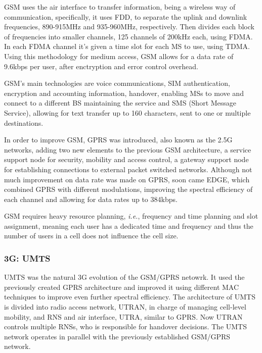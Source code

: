 \gls{GSM} uses the air interface to transfer information, being a wireless way of communication, specifically, it uses \gls{FDD}, to separate the uplink and downlink frequencies, 890-915MHz and 935-960MHz, respectively. Then divides each block of frequencies into smaller channels, 125 channels of 200kHz each, using \gls{FDMA}. In each \gls{FDMA} channel it's given a time slot for each \gls{MS} to use, using \gls{TDMA}. Using this methodology for medium access, \gls{GSM} allows for a data rate of 9.6kbps per user, after enctryption and error control overhead.

\gls{GSM}'s main technologies are voice communications, \gls{SIM} authentication, encryption and accounting information, handover, enabling \glspl{MS} to move and connect to a different \gls{BS} maintaining the service and SMS (Short Message Service), allowing for text transfer up to 160 characters, sent to one or multiple destinations.

In order to improve \gls{GSM}, \gls{GPRS} was introduced, also known as the 2.5G networks, adding two new elements to the previous \gls{GSM} architecture, a service support node for security, mobility and access control, a gateway support node for establishing connections to external packet switched networks. Although not much improvement on data rate was made on \gls{GPRS}, soon came \gls{EDGE}, which combined \gls{GPRS} with different modulations, improving the spectral efficiency of each channel and allowing for data rates up to 384kbps.

\gls{GSM} requires heavy resource planning, \textit{i.e.}, frequency and time planning and slot assignment, meaning each user has a dedicated time and frequency and thus the number of users in a cell does not influence the cell size.

\subsubsection{3G: UMTS}

\gls{UMTS} was the natural 3G evolution of the \gls{GSM}/\gls{GPRS} netowrk. It used the previously created \gls{GPRS} architecture and improved it using different \gls{MAC} techniques to improve even further spectral efficiency. The architecture of \gls{UMTS} is divided into radio access network, \gls{UTRAN}, in charge of managing cell-level mobility, and \gls{RNS} and air interface, \gls{UTRA}, similar to \gls{GPRS}. Now \gls{UTRAN} controls multiple \glspl{RNS}, who is responsible for handover decisions. The \gls{UMTS} network operates in parallel with the previously established \gls{GSM}/\gls{GPRS} network.

